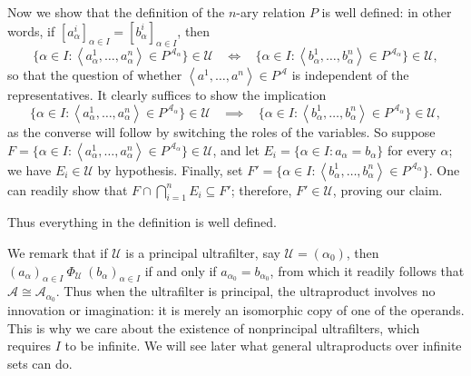 \documentclass{article}
\def\A{\mathcal A}
\def\U{\mathscr U}
\begin{document}
Now we show that the definition of the $n$-ary relation $P$ is well defined: in other words, if $[a^i_\alpha]_{\alpha\in I}=[b^i_\alpha]_{\alpha\in I}$, then
$$\{\alpha\in I:\left<a^1_\alpha,\dots,a^n_\alpha\right>\in P^{\A_\alpha}\}\in\U~~~~\iff~~~~\{\alpha\in I:\left<b^1_\alpha,\dots,b^n_\alpha\right>\in P^{\A_\alpha}\}\in\U,$$
so that the question of whether $\left<a^1,\dots,a^n\right>\in P^\A$ is independent of the representatives.  It clearly suffices to show the implication
$$\{\alpha\in I:\left<a^1_\alpha,\dots,a^n_\alpha\right>\in P^{\A_\alpha}\}\in\U~~~~\implies~~~~\{\alpha\in I:\left<b^1_\alpha,\dots,b^n_\alpha\right>\in P^{\A_\alpha}\}\in\U,$$
as the converse will follow by switching the roles of the variables.  So suppose $F=\{\alpha\in I:\left<a^1_\alpha,\dots,a^n_\alpha\right>\in P^{\A_\alpha}\}\in\U$, and let $E_i=\{\alpha\in I:a_\alpha=b_\alpha\}$ for every $\alpha$; we have $E_i\in\U$ by hypothesis.  Finally, set $F'=\{\alpha\in I:\left<b^1_\alpha,\dots,b^n_\alpha\right>\in P^{\A_\alpha}\}$.  One can readily show that $F\cap\bigcap_{i=1}^nE_i\subseteq F'$; therefore, $F'\in\U$, proving our claim.

Thus everything in the definition is well defined.

We remark that if $\U$ is a principal ultrafilter, say $\U=(\alpha_0)$, then $(a_\alpha)_{\alpha\in I}~\Phi_\U~(b_\alpha)_{\alpha\in I}$ if and only if $a_{\alpha_0}=b_{\alpha_0}$, from which it readily follows that $\A\cong\A_{\alpha_0}$.  Thus when the ultrafilter is principal, the ultraproduct involves no innovation or imagination: it is merely an isomorphic copy of one of the operands.  This is why we care about the existence of nonprincipal ultrafilters, which requires $I$ to be infinite.  We will see later what general ultraproducts over infinite sets can do.
\end{document}
